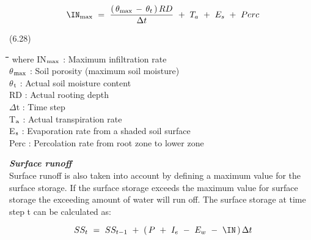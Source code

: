 \documentclass[11pt]{article}
\begin{document}
\begin{displaymath}
\IN _{\max } ~=~{\frac{(\, \theta  _{\max } \, -\, \theta  _{t} \, )\, RD}{\Delta t}} ~+~ T _{a} ~+~ E _{s} ~+~ Perc
\end{displaymath}

 \bigskip
\strut\hfill (6.28)

\nwln
\begin{tabbing}
\hspace{1.27cm}\=\hspace{1.27cm}\=\hspace{1.27cm}\=\hspace{1.27cm}\=%
\hspace{1.27cm}\=\hspace{1.27cm}\=\hspace{1.27cm}\=\hspace{1.27cm}\=%
\hspace{1.27cm}\=\hspace{1.27cm}\=\kill
where\> IN$_{{\rm max}}$\> : Maximum infiltration rate\> \> \> \> \> \> \> \> [cm d$^{{\rm -1}}$]\\
\>$\theta$$_{{\rm max}}$\> : Soil porosity (maximum soil moisture)\> \> \> \> \> \> \> \> [cm$^{{\rm 3}}$ cm$^{{\rm -3}}$]\\
\>$\theta$$_{{\rm t}}$\> : Actual soil moisture content\> \> \> \> \> \> \> \> [cm$^{{\rm 3}}$ cm$^{{\rm -3}}$]\\
\>RD\> : Actual rooting depth\> \> \> \> \> \> \> \> [cm]\\
\>$\Delta$t\> : Time step\> \> \> \> \> \> \> \> [d]\\
\>T$_{{\rm a}}$\> : Actual transpiration rate \> \> \> \> \> \> \> \> [cm d$^{{\rm -1}}$]\\
\>E$_{{\rm s}}$\> : Evaporation rate from a shaded soil surface\> \> \> \> \> \> \> \> [cm d$^{{\rm -1}}$]\\
\>Perc\> : Percolation rate from root zone to lower zone\> \> \> \> \> \> \> \> [cm d$^{{\rm -1}}$]
\end{tabbing}
 {\bf {\it Surface runoff\/}}\\
Surface runoff is also taken into account by defining a maximum value for the surface
storage. If the surface storage exceeds the maximum value for surface storage the
exceeding amount of water will run off. The surface storage at time step t can be
calculated as:

\begin{displaymath}
 SS _{t} ~=~ SS _{t-1} ~+~ (\, P ~+~ I _{e} ~-~ E _{w} ~-~ \IN\, )\, \Delta t
\end{displaymath}
\end{document}
